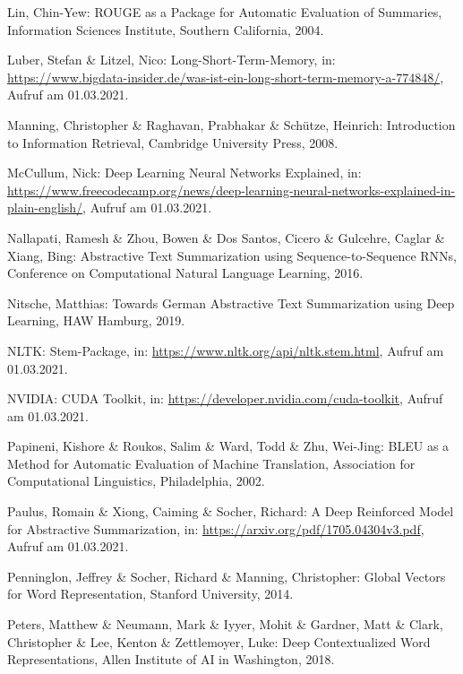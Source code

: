 \begin{thebibliography}{50}
Lin, Chin-Yew: ROUGE as a Package for Automatic Evaluation of Summaries, Information Sciences Institute, Southern California, 2004.

Luber, Stefan \& Litzel, Nico: Long-Short-Term-Memory, in: \url{https://www.bigdata-insider.de/was-ist-ein-long-short-term-memory-a-774848/}, Aufruf am 01.03.2021.

Manning, Christopher \& Raghavan, Prabhakar \& Schütze, Heinrich: Introduction to Information Retrieval, Cambridge University Press, 2008.

McCullum, Nick: Deep Learning Neural Networks Explained, in: \url{https://www.freecodecamp.org/news/deep-learning-neural-networks-explained-in-plain-english/}, Aufruf am 01.03.2021.

Nallapati, Ramesh \& Zhou, Bowen \& Dos Santos, Cicero \& Gulcehre, Caglar \& Xiang, Bing: Abstractive Text Summarization using Sequence-to-Sequence RNNs, Conference on Computational Natural Language Learning, 2016.

Nitsche, Matthias: Towards German Abstractive Text Summarization using Deep Learning, HAW Hamburg, 2019.

NLTK: Stem-Package, in: \url{https://www.nltk.org/api/nltk.stem.html}, Aufruf am 01.03.2021.

NVIDIA: CUDA Toolkit, in: \url{https://developer.nvidia.com/cuda-toolkit}, Aufruf am 01.03.2021.

Papineni, Kishore \& Roukos, Salim \& Ward, Todd \& Zhu, Wei-Jing: BLEU as a Method for Automatic Evaluation of Machine Translation, Association for Computational Linguistics, Philadelphia, 2002.

Paulus, Romain \& Xiong, Caiming \& Socher, Richard: A Deep Reinforced Model for Abstractive Summarization, in: \url{https://arxiv.org/pdf/1705.04304v3.pdf}, Aufruf am 01.03.2021.

Penninglon, Jeffrey \& Socher, Richard \& Manning, Christopher: Global Vectors for Word Representation, Stanford University, 2014.

Peters, Matthew \& Neumann, Mark \& Iyyer, Mohit \& Gardner, Matt \& Clark, Christopher \& Lee, Kenton \& Zettlemoyer, Luke: Deep Contextualized Word Representations, Allen Institute of AI in Washington, 2018.


\end{thebibliography}
